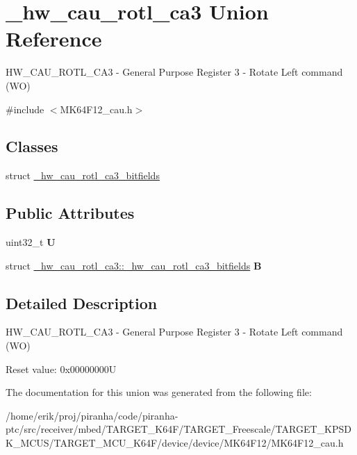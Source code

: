 \hypertarget{union__hw__cau__rotl__ca3}{}\section{\+\_\+hw\+\_\+cau\+\_\+rotl\+\_\+ca3 Union Reference}
\label{union__hw__cau__rotl__ca3}


H\+W\+\_\+\+C\+A\+U\+\_\+\+R\+O\+T\+L\+\_\+\+C\+A3 -\/ General Purpose Register 3 -\/ Rotate Left command (WO)  




{\ttfamily \#include $<$M\+K64\+F12\+\_\+cau.\+h$>$}

\subsection*{Classes}
\begin{DoxyCompactItemize}
\item 
struct \hyperlink{struct__hw__cau__rotl__ca3_1_1__hw__cau__rotl__ca3__bitfields}{\+\_\+hw\+\_\+cau\+\_\+rotl\+\_\+ca3\+\_\+bitfields}
\end{DoxyCompactItemize}
\subsection*{Public Attributes}
\begin{DoxyCompactItemize}
\item 
uint32\+\_\+t {\bfseries U}\hypertarget{union__hw__cau__rotl__ca3_aa6455ef66bd6f230a2961b6f64dda8ea}{}\label{union__hw__cau__rotl__ca3_aa6455ef66bd6f230a2961b6f64dda8ea}

\item 
struct \hyperlink{struct__hw__cau__rotl__ca3_1_1__hw__cau__rotl__ca3__bitfields}{\+\_\+hw\+\_\+cau\+\_\+rotl\+\_\+ca3\+::\+\_\+hw\+\_\+cau\+\_\+rotl\+\_\+ca3\+\_\+bitfields} {\bfseries B}\hypertarget{union__hw__cau__rotl__ca3_ae0e3dd98cdee98f96d9609c76546fbf9}{}\label{union__hw__cau__rotl__ca3_ae0e3dd98cdee98f96d9609c76546fbf9}

\end{DoxyCompactItemize}


\subsection{Detailed Description}
H\+W\+\_\+\+C\+A\+U\+\_\+\+R\+O\+T\+L\+\_\+\+C\+A3 -\/ General Purpose Register 3 -\/ Rotate Left command (WO) 

Reset value\+: 0x00000000U 

The documentation for this union was generated from the following file\+:\begin{DoxyCompactItemize}
\item 
/home/erik/proj/piranha/code/piranha-\/ptc/src/receiver/mbed/\+T\+A\+R\+G\+E\+T\+\_\+\+K64\+F/\+T\+A\+R\+G\+E\+T\+\_\+\+Freescale/\+T\+A\+R\+G\+E\+T\+\_\+\+K\+P\+S\+D\+K\+\_\+\+M\+C\+U\+S/\+T\+A\+R\+G\+E\+T\+\_\+\+M\+C\+U\+\_\+\+K64\+F/device/device/\+M\+K64\+F12/M\+K64\+F12\+\_\+cau.\+h\end{DoxyCompactItemize}
